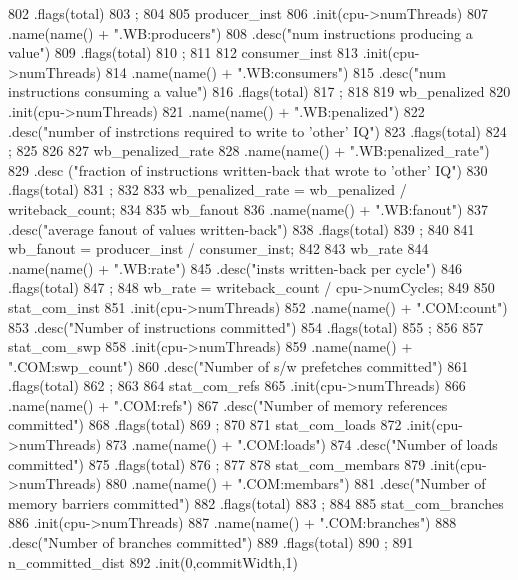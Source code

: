\begin{DoxyCode}
{802         .flags(total)
803         ;
804 
805     producer_inst
806         .init(cpu->numThreads)
807         .name(name() + ".WB:producers")
808         .desc("num instructions producing a value")
809         .flags(total)
810         ;
811 
812     consumer_inst
813         .init(cpu->numThreads)
814         .name(name() + ".WB:consumers")
815         .desc("num instructions consuming a value")
816         .flags(total)
817         ;
818 
819     wb_penalized
820         .init(cpu->numThreads)
821         .name(name() + ".WB:penalized")
822         .desc("number of instrctions required to write to 'other' IQ")
823         .flags(total)
824         ;
825 
826 
827     wb_penalized_rate
828         .name(name() + ".WB:penalized_rate")
829         .desc ("fraction of instructions written-back that wrote to 'other' IQ")
830         .flags(total)
831         ;
832 
833     wb_penalized_rate = wb_penalized / writeback_count;
834 
835     wb_fanout
836         .name(name() + ".WB:fanout")
837         .desc("average fanout of values written-back")
838         .flags(total)
839         ;
840 
841     wb_fanout = producer_inst / consumer_inst;
842 
843     wb_rate
844         .name(name() + ".WB:rate")
845         .desc("insts written-back per cycle")
846         .flags(total)
847         ;
848     wb_rate = writeback_count / cpu->numCycles;
849 
850     stat_com_inst
851         .init(cpu->numThreads)
852         .name(name() + ".COM:count")
853         .desc("Number of instructions committed")
854         .flags(total)
855         ;
856 
857     stat_com_swp
858         .init(cpu->numThreads)
859         .name(name() + ".COM:swp_count")
860         .desc("Number of s/w prefetches committed")
861         .flags(total)
862         ;
863 
864     stat_com_refs
865         .init(cpu->numThreads)
866         .name(name() +  ".COM:refs")
867         .desc("Number of memory references committed")
868         .flags(total)
869         ;
870 
871     stat_com_loads
872         .init(cpu->numThreads)
873         .name(name() +  ".COM:loads")
874         .desc("Number of loads committed")
875         .flags(total)
876         ;
877 
878     stat_com_membars
879         .init(cpu->numThreads)
880         .name(name() +  ".COM:membars")
881         .desc("Number of memory barriers committed")
882         .flags(total)
883         ;
884 
885     stat_com_branches
886         .init(cpu->numThreads)
887         .name(name() + ".COM:branches")
888         .desc("Number of branches committed")
889         .flags(total)
890         ;
891     n_committed_dist
892         .init(0,commitWidth,1)
}
\end{DoxyCode}
